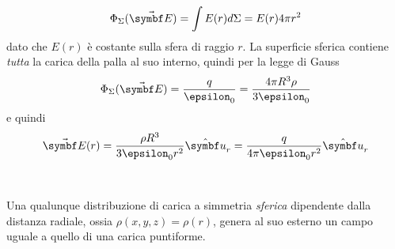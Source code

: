 \begin{itemize}
\begin{minipage}{0.5\textwidth}
		\begin{equation*}
			\Phi_{\Sigma}(\vba{E})=\int E(r)d\Sigma=E(r)4\pi r^2
		\end{equation*}
		dato che $E(r)$ è costante sulla sfera di raggio $r$.
		La superficie sferica contiene \textit{tutta} la carica della palla al suo interno, quindi per la legge di Gauss
		\begin{equation*}
			\Phi_{\Sigma}(\vba{E})=\frac{q}{\epsilon_0}=\frac{4 \pi R^3\rho}{3\epsilon_0}
		\end{equation*}
		e quindi
		\begin{equation}
			\vba{E}(r)=\frac{\rho R^3}{3\epsilon_0r^2}\vbh{u}_r=\frac{q}{4\pi\epsilon_0 r^2}\vbh{u}_r
		\end{equation}
	\end{minipage}\\
\end{itemize}
\begin{observe}
	Una qualunque distribuzione di carica a simmetria \textit{sferica} dipendente dalla distanza radiale, ossia $\rho(x,y,z)=\rho(r)$, genera al suo esterno un campo uguale a quello di una carica puntiforme.
\end{observe}
